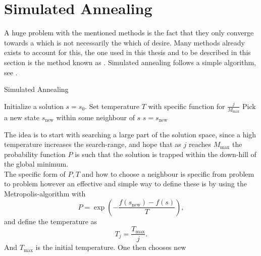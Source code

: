 \section{Simulated Annealing\label{sec:simulated_annealing}}
    A huge problem with the mentioned methods is the fact that they only
    converge towards a  which is not necessarily the
     which of desire. Many methods already exists to
    account for this, the one used in this thesis and to be described in this
    section is the method known as . Simulated
    annealing follows a simple algorithm, see .
        \begin{algorithm}[H]
            \caption{Simulated Annealing\label{alg:simulated_annealing}}
            \begin{algorithmic}[H]
                \State Initialize a solution $s=s_0$. 
                    \State Set temperature $T$ with specific function for
                    $\frac{j}{M_{\text{max}}}$
                    \State Pick a new state $s_{\text{new}}$ within some
                    neighbour of $s$
                        \State $s = s_{\text{new}}$
                    \EndIf
                \EndFor
            \end{algorithmic}
        \end{algorithm}
    The idea is to start with searching a large part of the solution space,
    since a high temperature increases the search-range, and hope that as $j$
    reaches $M_{\text{max}}$ the probability function $P$ is such that the
    solution is trapped within the down-hill of the global minimum. \\ 
    The specific form of $P, T$ and how to choose a neighbour is specific from
    problem to problem however an effective and simple way to define these is
    by using the Metropolis-algorithm with
        \begin{equation}
            P = \exp(-\frac{f(s_{\text{new}}) - f(s)}{T}),
        \end{equation}
    and define the temperature as
        \begin{equation}
            T_j = \frac{T_{\text{max}}}{j}.
        \end{equation}
    And $T_{\text{max}}$ is the initial temperature. One then chooses new
